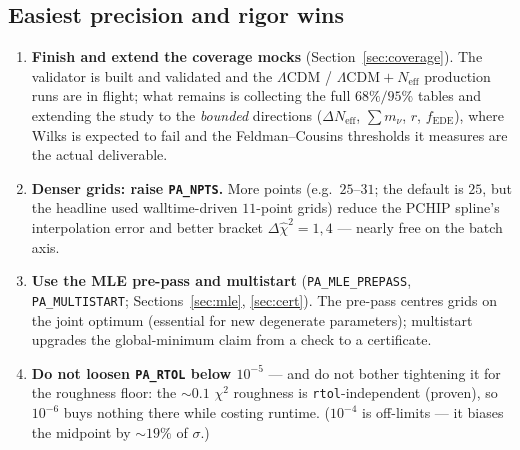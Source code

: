 \documentclass[11pt]{article}
\newcommand{\code}[1]{\texttt{\small #1}}
\newcommand{\Neff}{N_{\mathrm{eff}}}
\newcommand{\chisq}{\chi^2}
\newcommand{\dchisq}{\Delta\hat\chi^2}
\begin{document}
\subsection{Easiest precision and rigor wins}
\begin{enumerate}[leftmargin=2em,itemsep=2pt]
\item \textbf{Finish and extend the coverage mocks} (Section~\ref{sec:coverage}).
The validator is built and validated and the $\Lambda$CDM /
$\Lambda\mathrm{CDM}+\Neff$ production runs are in flight; what remains is
collecting the full $68\%/95\%$ tables and extending the study to the
\emph{bounded} directions ($\Delta\Neff$, $\sum m_\nu$, $r$, $f_{\mathrm{EDE}}$),
where Wilks is expected to fail and the Feldman--Cousins thresholds it
measures are the actual deliverable.
\item \textbf{Denser grids: raise \code{PA\_NPTS}.} More points (e.g.\
$25$--$31$; the default is $25$, but the headline used walltime-driven
$11$-point grids) reduce the PCHIP spline's interpolation error and better
bracket $\dchisq=1,4$ --- nearly free on the batch axis.
\item \textbf{Use the MLE pre-pass and multistart}
(\code{PA\_MLE\_PREPASS}, \code{PA\_MULTISTART}; Sections~\ref{sec:mle},
\ref{sec:cert}). The pre-pass centres grids on the joint optimum (essential
for new degenerate parameters); multistart upgrades the global-minimum
claim from a check to a certificate.
\item \textbf{Do not loosen \code{PA\_RTOL} below $10^{-5}$} --- and do not
bother tightening it for the roughness floor: the $\sim0.1$ $\chisq$
roughness is \code{rtol}-independent (proven), so $10^{-6}$ buys nothing
there while costing runtime. ($10^{-4}$ is off-limits --- it biases the
midpoint by $\sim19\%$ of $\sigma$.)
\end{enumerate}
\end{document}
